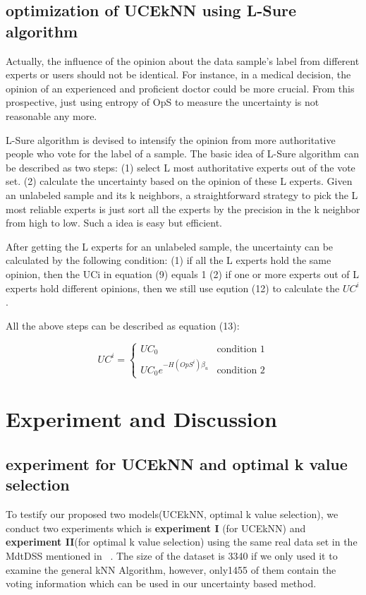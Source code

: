 \documentclass[runningheads]{llncs}
\begin{document}
\subsection{optimization of UCEkNN using L-Sure algorithm}
Actually, the influence of the opinion about the data sample's label from different  experts or users should not be identical. For instance, in a medical decision, the opinion of an experienced and proficient doctor could be more crucial. From this prospective, just using entropy of OpS to measure the uncertainty is not reasonable any more.

L-Sure algorithm is devised to intensify the opinion from more authoritative people who vote for the label of a sample. The basic idea of L-Sure algorithm can be described as two steps: (1) select L most authoritative experts out of the vote set. (2) calculate the uncertainty based on the opinion of these L experts.
Given an unlabeled sample and its k neighbors, a straightforward strategy to pick the L most reliable experts is just sort all the experts by the precision in the k neighbor from high to low. Such a idea is easy but efficient.

After getting the L experts for an unlabeled sample, the uncertainty can be calculated by the following condition: (1) if all the L experts hold the same opinion, then the UCi in equation (9) equals 1 (2) if one or more experts out of L experts hold different opinions, then we still use eqution (12) to calculate the $UC^i$.

All the above steps can be described as equation (13):

\begin{equation}
UC^i=
\begin{cases}
UC_0& \text{condition 1}\\
UC_0e^{-H(OpS^i)\beta_u}& \text{condition 2}
\end{cases}
\end{equation}

\section{Experiment and Discussion}
\subsection{experiment for UCEkNN and optimal k value selection}
To testify our proposed two models(UCEkNN, optimal k value selection), we conduct two experiments which is \textbf{experiment I} (for UCEkNN) and \textbf{experiment II}(for optimal k value selection) using the same real data set in the MdtDSS mentioned in ~\cite{ref_article9}. The size of the dataset is 3340 if we only used it to examine the general kNN Algorithm, however, only1455 of them contain the voting information which can be used in our uncertainty based method. 
\end{document}
